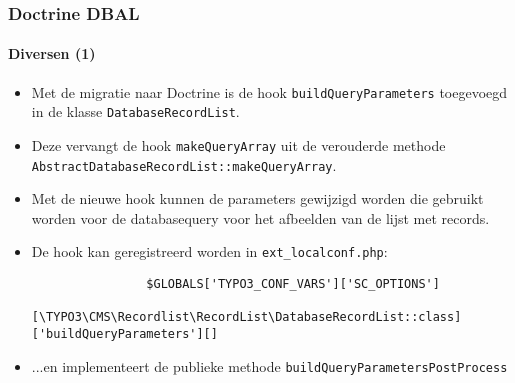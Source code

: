 \begin{frame}[fragile]
	\frametitle{Doctrine DBAL}
	\framesubtitle{Diversen (1)}

	\lstset{basicstyle=\tiny\ttfamily}

	\begin{itemize}

		\item Met de migratie naar Doctrine is de hook \texttt{buildQueryParameters} toegevoegd in de klasse
			\texttt{DatabaseRecordList}.

		\item Deze vervangt de hook \texttt{makeQueryArray} uit de verouderde methode
			\texttt{AbstractDatabaseRecordList::makeQueryArray}.

		\item Met de nieuwe hook kunnen de parameters gewijzigd worden die gebruikt worden voor de databasequery
			voor het afbeelden van de lijst met records.

		\item De hook kan geregistreerd worden in \texttt{ext\_localconf.php}:

			\begin{lstlisting}
				$GLOBALS['TYPO3_CONF_VARS']['SC_OPTIONS']
				  [\TYPO3\CMS\Recordlist\RecordList\DatabaseRecordList::class]['buildQueryParameters'][]
			\end{lstlisting}

		\item ...en implementeert de publieke methode \texttt{buildQueryParametersPostProcess}

	\end{itemize}

\end{frame}


